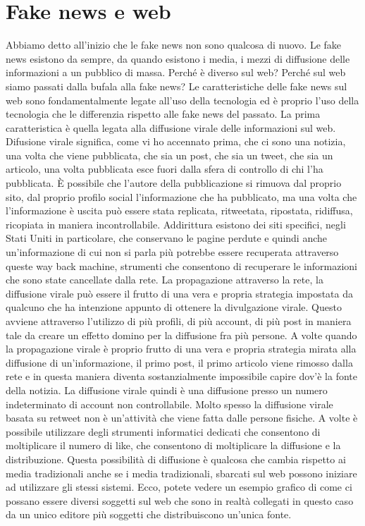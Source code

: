 \section{Fake news e web}
Abbiamo detto all'inizio che le fake news non sono qualcosa di nuovo. Le fake news esistono da sempre, da quando esistono i media, i mezzi di diffusione delle informazioni a un pubblico di massa. Perché è diverso sul web? Perché sul web siamo passati dalla bufala alla fake news? 
Le caratteristiche delle fake news sul web sono fondamentalmente legate all'uso della tecnologia ed è proprio l'uso della tecnologia che le differenzia rispetto alle fake news del passato. 
La prima caratteristica è quella legata alla diffusione virale delle informazioni sul web. Difusione virale significa, come vi ho accennato prima, che ci sono una notizia, una volta che viene pubblicata, che sia un post, che sia un tweet, che sia un articolo, una volta pubblicata esce fuori dalla sfera di controllo di chi l'ha pubblicata. È possibile che l'autore della pubblicazione si rimuova dal proprio sito, dal proprio profilo social l'informazione che ha pubblicato, ma una volta che l'informazione è uscita può essere stata replicata, ritweetata, ripostata, ridiffusa, ricopiata in maniera incontrollabile. Addirittura esistono dei siti specifici, negli Stati Uniti in particolare, che conservano le pagine perdute e quindi anche un'informazione di cui non si parla più potrebbe essere recuperata attraverso queste way back machine, strumenti che consentono di recuperare le informazioni che sono state cancellate dalla rete. 
La propagazione attraverso la rete, la diffusione virale può essere il frutto di una vera e propria strategia impostata da qualcuno che ha intenzione appunto di ottenere la divulgazione virale. Questo avviene attraverso l'utilizzo di più profili, di più account, di più post in maniera tale da creare un effetto domino per la diffusione fra più persone. A volte quando la propagazione virale è proprio frutto di una vera e propria strategia mirata alla diffusione di un'informazione, il primo post, il primo articolo viene rimosso dalla rete e in questa maniera diventa sostanzialmente impossibile capire dov'è la fonte della notizia. 
La diffusione virale quindi è una diffusione presso un numero indeterminato di account non controllabile. Molto spesso la diffusione virale basata su retweet non è un'attività che viene fatta dalle persone fisiche. A volte è possibile utilizzare degli strumenti informatici dedicati che consentono di moltiplicare il numero di like, che consentono di moltiplicare la diffusione e la distribuzione. 
Questa possibilità di diffusione è qualcosa che cambia rispetto ai media tradizionali anche se i media tradizionali, sbarcati sul web possono iniziare ad utilizzare gli stessi sistemi. 
Ecco, potete vedere un esempio grafico di come ci possano essere diversi soggetti sul web che sono in realtà collegati in questo caso da un unico editore più soggetti che distribuiscono un'unica fonte. 

